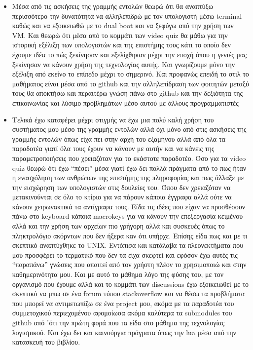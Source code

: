 \begin{itemize}
\tightlist
\item
  Μέσα από τις ασκήσεις της γραμμής εντολών θεωρώ ότι θα αναπτύξω
  περισσότερο την δυνατότητα να αλληλεπιδρώ με τον υπολογιστή μέσω
  terminal καθώς και να εξοικειωθώ με το dual boot και να ξεφύγω από την
  χρήση των VM. Και θεωρώ ότι μέσα από το κομμάτι των video quiz θα μάθω
  για την ιστορική εξέλιξη των υπολογιστών και της επιστήμης τους κάτι
  το οποίο δεν έχουμε ιδέα το πώς ξεκίνησαν και εξελίχθηκαν μέχρι την
  εποχή όπου η γενιές μας ξεκίνησαν να κάνουν χρήση της τεχνολογίας
  αυτής. Και γνωρίζουμε μόνο την εξέλιξη από εκείνο το επίπεδο μέχρι το
  σημερινό. Και προφανώς επειδή το στιλ το μαθήματος είναι μέσα από το
  github και την αλληλεπίδραση των φοιτητών μεταξύ τους θα αποκτήσω και
  περαιτέρω γνώση πάνω στο github και την δεξιότητα της επικοινωνίας και
  λύσιμο προβλημάτων μέσο αυτού με άλλους προγραμματιστές
\item
  Τελικά έχω καταφέρει μέχρι στιγμής να έχω μια πολύ καλή χρήση του
  συστήματος μου μέσο της γραμμής εντολών αλλά όχι μόνο από στις
  ασκήσεις της γραμμής εντολών όπως είχα πει στην αρχή του εξαμήνου αλλά
  από όλα τα παραδοτέα γιατί όλα τους έχουν να κάνουν με αυτήν και να
  κάνεις της παραμετροποιήσεις που χρειαζόταν για το εκάστοτε παραδοτέο.
  Όσο για τα video quiz θεωρώ ότι έχω ``πέσει'' μέσα γιατί έχω δει πολλά
  πράγματα από το πως ήταν η ενασχόληση των ανθρώπων της επιστήμης της
  πληροφορίας και πως άλλαξε με την εισχώρηση των υπολογιστών στις
  δουλείες του. Όπου δεν χρειαζόταν να μετακινούνται σε όλο το κτίριο
  για να πάρουν κάποια έγγραφα αλλά ούτε να κάνουν χειρωνακτικά τα
  αντίγραφα τους. Είδα τις ιδέες που είχαν να προσθέσουν πάνω στο
  keyboard κάποια macrokeys για να κάνουν την επεξεργασία κειμένου αλλά
  και την χρήση των αρχείων πιο γρήγορη αλλά και συσκευές όπως το
  πληκτρολόγιο ακόρντων που δεν ήξερα καν ότι υπήρχε. Επίσης είδα πως
  και με τι σκεπτικό αναπτύχθηκε το UNIX. Εντόπισα και κατάλαβα τα
  πλεονεκτήματα που μου προσφέρει το τερματικό που δεν τα είχα σκεφτεί
  και εφόσον έχω αυτές τις ``παραπάνω'' γνώσεις που απαιτεί από τον
  χρήστη πλέον το χρησιμοποιώ και στην καθημερινότητα μου. Και με αυτό
  το μάθημα λόγο της φύσης του, με τον οργανισμό που έχουμε αλλά και το
  κομμάτι των discussions έχω εξοικειωθεί με το σκεπτικό να μπω σε ένα
  forum τύπου stackoverflow και να θέσω τα προβλήματα που μπορεί να
  αντιμετωπίζω σε ένα project μου, ακόμα με τα παραδοτέα του
  συμμετοχικού περιεχομένου αφομοίωσα ακόμα καλύτερα τα submodules του
  github από ΄ότι την πρώτη φορά που τα είδα στο μάθημα της τεχνολογίας
  λογισμικού. Και έχω δει και καινούργια πράγματα όπως την lua μέσα από
  την κατασκευή του βιβλίου.
\end{itemize}

